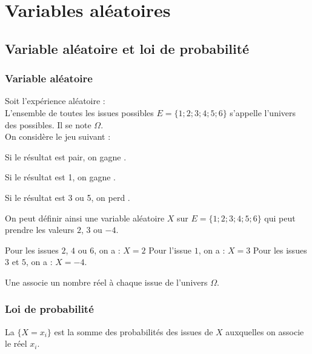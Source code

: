 \chapter{Variables aléatoires}
\thispagestyle{fancy}

\section{Variable aléatoire et loi de probabilité}

\subsection{Variable aléatoire}

\begin{bexemple}
Soit l'expérience aléatoire :  \\
L'ensemble de toutes les issues possibles $E = \{1 ; 2 ; 3 ; 4 ; 5 ; 6\}$ s'appelle l'univers des possibles. Il se note $\Omega$.\\
On considère le jeu suivant :\\
\begin{itemEx}
\item Si le résultat est pair, on gagne .
\item Si le résultat est 1, on gagne .
\item Si le résultat est 3 ou 5, on perd .
\end{itemEx}
On peut définir ainsi une variable aléatoire $X$ sur $E = \{1 ; 2 ; 3 ; 4 ; 5 ; 6\}$ qui peut prendre les valeurs $2$, $3$ ou $-4$.

Pour les issues $2$, $4$ ou $6$, on a : $X = 2$
Pour l'issue $1$, on a : $X = 3$
Pour les issues $3$ et $5$, on a : $X = -4$.
\end{bexemple}

\begin{bdefi}
Une  associe un nombre réel à chaque issue de l'univers $\Omega$.\\
\end{bdefi}

\subsection{Loi de probabilité}

\begin{bdefi}
    La  $\{X=x_i\}$ est la somme des probabilités des issues de $X$ auxquelles on associe le réel $x_i$.
\end{bdefi}

